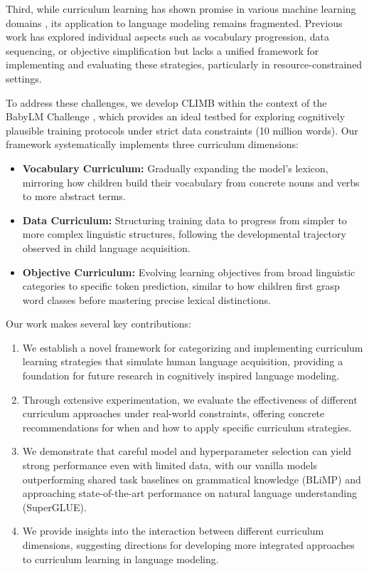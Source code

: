 Third, while curriculum learning has shown promise in various machine learning domains \citep{bengio2009curriculum}, its application to language modeling remains fragmented. Previous work has explored individual aspects such as vocabulary progression, data sequencing, or objective simplification but lacks a unified framework for implementing and evaluating these strategies, particularly in resource-constrained settings.

To address these challenges, we develop CLIMB within the context of the BabyLM Challenge \citep{warstadt2023babylm1}, which provides an ideal testbed for exploring cognitively plausible training protocols under strict data constraints (10 million words). Our framework systematically implements three curriculum dimensions:

\begin{itemize}
    \item \textbf{Vocabulary Curriculum:} Gradually expanding the model's lexicon, mirroring how children build their vocabulary from concrete nouns and verbs to more abstract terms.
    \item \textbf{Data Curriculum:} Structuring training data to progress from simpler to more complex linguistic structures, following the developmental trajectory observed in child language acquisition.
    \item \textbf{Objective Curriculum:} Evolving learning objectives from broad linguistic categories to specific token prediction, similar to how children first grasp word classes before mastering precise lexical distinctions.
\end{itemize}

Our work makes several key contributions:

\begin{enumerate}
    \item We establish a novel framework for categorizing and implementing curriculum learning strategies that simulate human language acquisition, providing a foundation for future research in cognitively inspired language modeling.
    
    \item Through extensive experimentation, we evaluate the effectiveness of different curriculum approaches under real-world constraints, offering concrete recommendations for when and how to apply specific curriculum strategies.
    
    \item We demonstrate that careful model and hyperparameter selection can yield strong performance even with limited data, with our vanilla models outperforming shared task baselines on grammatical knowledge (BLiMP) and approaching state-of-the-art performance on natural language understanding (SuperGLUE).
    
    \item We provide insights into the interaction between different curriculum dimensions, suggesting directions for developing more integrated approaches to curriculum learning in language modeling.
\end{enumerate}

